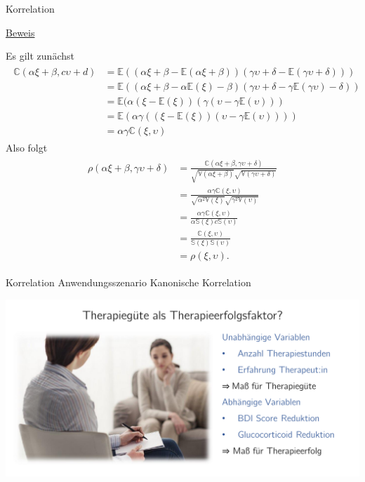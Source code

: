 \documentclass[
  8pt,
  ignorenonframetext,
]{beamer}
\begin{document}
\begin{frame}{Korrelation}
\protect\hypertarget{korrelation-10}{}
\footnotesize

\underline{Beweis}

Es gilt zunächst \begin{align}
\begin{split}
\mathbb{C}(\alpha\xi+\beta,c\upsilon+d)
& = \mathbb{E}((\alpha\xi+\beta-\mathbb{E}(\alpha\xi+\beta))(\gamma\upsilon+\delta-\mathbb{E}(\gamma\upsilon+\delta)))    \\
& = \mathbb{E}((\alpha\xi+\beta-\alpha\mathbb{E}(\xi)-\beta)(\gamma\upsilon+\delta-\gamma\mathbb{E}(\gamma\upsilon)-\delta))   \\
& = \mathbb{E}(\alpha(\xi-\mathbb{E}(\xi))(\gamma(\upsilon -\gamma\mathbb{E}(\upsilon)))             \\
& = \mathbb{E}(\alpha\gamma((\xi-\mathbb{E}(\xi))(\upsilon -\gamma\mathbb{E}(\upsilon))))            \\
&  = \alpha\gamma\mathbb{C}(\xi,\upsilon)
\end{split}
\end{align} Also folgt \begin{align}
\begin{split}
\rho(\alpha\xi + \beta, \gamma\upsilon + \delta)
& = \frac{\mathbb{C}(\alpha\xi+\beta,\gamma\upsilon+\delta)}{\sqrt{\mathbb{V}(\alpha\xi+\beta)}\sqrt{\mathbb{V}(\gamma\upsilon+\delta)}} \\
& = \frac{\alpha\gamma\mathbb{C}(\xi,\upsilon)}{\sqrt{\alpha^2\mathbb{V}(\xi)}\sqrt{\gamma^2\mathbb{V}(\upsilon)}}     \\
& = \frac{\alpha\gamma\mathbb{C}(\xi,\upsilon)}{\alpha\mathbb{S}(\xi)c\mathbb{S}(\upsilon)}         \\
& = \frac{\mathbb{C}(\xi,\upsilon)}{\mathbb{S}(\xi)\mathbb{S}(\upsilon)}             \\
& = \rho(\xi,\upsilon).
\end{split}
\end{align}
\end{frame}

\begin{frame}{Korrelation}
\protect\hypertarget{korrelation-11}{}
Anwendungsszenario Kanonische Korrelation \vspace{3mm}

\begin{center}\includegraphics[width=0.9\linewidth]{7_Abbildungen/mvda_7_beispielszenario_kanonische_korrelation} \end{center}
\end{frame}
\end{document}
